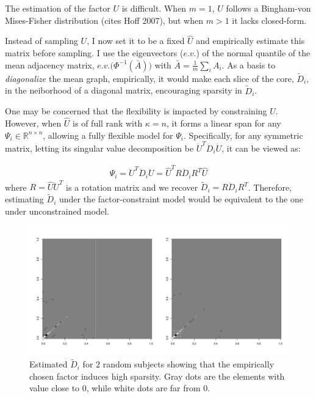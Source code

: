 \documentclass[10pt]{article}
\newcommand{\be}{\begin{equation}\begin{aligned}}
\newcommand{\ee}{\end{aligned}\end{equation}}
\newcommand{\bb}[1]{\mathbb{#1}}
\begin{document}
The estimation of the factor $U$ is difficult. When $m=1$, $U$ follows a Bingham-von Mises-Fisher distribution (cites Hoff 2007), but when $m>1$ it lacks closed-form.


Instead of sampling $U$, I now set it to be a fixed $\hat U$ and empirically estimate this matrix before sampling.  I use the eigenvectors ($e.v.$) of the normal quantile of the mean adjacency matrix, $e.v.\big(\Phi^{-1}(\bar A)\big)$ with $\bar A = \frac{1}{m} \sum_i A_i$. As a basis to {\it diagonalize} the mean graph, empirically, it would make each slice of the core, $\tilde D_{i}$, in the neiborhood of a diagonal matrix, encouraging sparsity in $\tilde D_{i}$.

One may be concerned that the flexibility is impacted by constraining $U$. However, when $\hat U$ is of full rank with $\kappa=n$, it forms a linear span for any $\Psi_i \in \bb R^{n\times n}$, allowing a fully flexible model for $\Psi_i$. Specifically, for any symmetric matrix, letting its singular value decomposition be $\ddot{U}^T \ddot{D}_i \ddot{U}$, it can be viewed as:

\be
\Psi_i= \ddot{U}^T \ddot{D}_i \ddot{U} = \hat{U}^T R \ddot{D}_i R^T \hat{U}
\ee
where $R=\hat{U}\ddot{U}^T$ is a rotation matrix and we recover $\tilde{D}_i = R \ddot{D}_i R^T$. Therefore, estimating $\tilde{D}_i $ under the factor-constraint model would be equivalent to the one under unconstrained model.



\begin{figure}[H]
 \includegraphics[width=1\textwidth]{D}
\caption{Estimated $\tilde D_i$ for $2$ random subjects showing that the empirically chosen factor induces high sparsity. Gray dots are the elements with value close to $0$, while white dots are far from 0.}
\label{demoD}
\end{figure}
\end{document}

